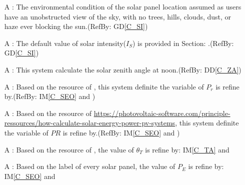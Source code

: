 \documentclass[12pt]{article}
\newcommand{\dref}[1]{GD\ref{#1}}
\newcommand{\ddref}[1]{DD\ref{#1}}
\newcounter{assumpnum} %
\newcommand{\iref}[1]{IM\ref{#1}}
\begin{document}
\begin{itemize}

\item[A\refstepcounter{assumpnum}\theassumpnum \label{a_spe}]: The environmental condition of the solar panel location assumed as users have an unobstructed view of the sky, with no trees, hills, clouds, dust, or haze ever blocking the sun.(RefBy: \dref{C_SI})\\

\item[A\refstepcounter{assumpnum}\theassumpnum \label{a_dsip}]: The default value of solar intensity($I_S$) is provided in Section: .(RefBy: \dref{C_SI})\\

\item[A\refstepcounter{assumpnum}\theassumpnum \label{a_dsia}]: This system calculate the solar zenith angle at noon.(RefBy: \ddref{C_ZA})\\

\item[A\refstepcounter{assumpnum}\theassumpnum \label{a_dp_r}]: Based
 on the resource of \cite{EMPA2011}, this system definite the variable of $P_r$ is refine by.(RefBy: \iref{C_SEO} and )\\

\item[A\refstepcounter{assumpnum}\theassumpnum \label{a_dpr}]: Based
 on the resource of  \url{https://photovoltaic-software.com/principle-ressources/how-calculate-solar-energy-power-pv-systems}, this system definite the variable of $PR$ is refine by.(RefBy: \iref{C_SEO} and )\\

\item[A\refstepcounter{assumpnum}\theassumpnum \label{a_tilta}]: Based
 on the resource of \cite{Charles2001}, the value of $\theta_{T}$ is refine by: \iref{C_TA} and \\


\item[A\refstepcounter{assumpnum}\theassumpnum \label{a_panele}]: Based
 on the label of every solar panel, the value of $P_E$ is refine by: \iref{C_SEO} and \\

\end{itemize}
\end{document}
